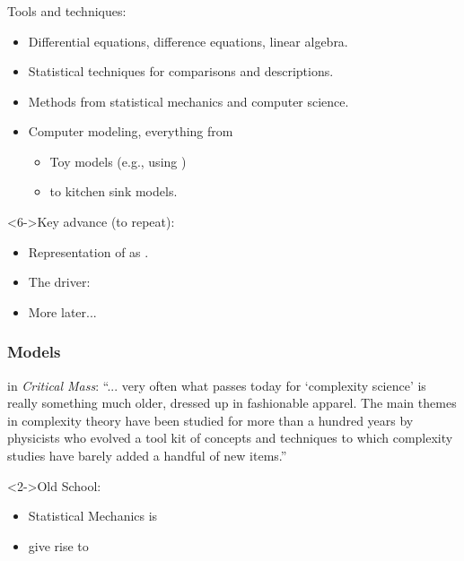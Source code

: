 \begin{frame}
  \frametitle{}

  \begin{block}{Tools and techniques:}
    \begin{itemize}
    \item<2-> 
      Differential equations, difference equations, linear algebra.
    \item<3-> 
      Statistical techniques for comparisons and descriptions.
    \item<4-> 
      Methods from statistical mechanics and computer science.
    \item<5-> 
      Computer modeling, everything from
      \begin{itemize}
      \item 
        Toy models (e.g., using )
      \item 
        to kitchen sink models.
      \end{itemize}
    \end{itemize}
  \end{block}

  \begin{block}<6->{Key advance (to repeat):}
    \begin{itemize}
    \item<6-> Representation of  as .
    \item<7-> The driver: 
    \item<8-> More later...
    \end{itemize}
  \end{block}

\end{frame}

\begin{frame}
  \frametitle{Models}

  \begin{block}{ in \textit{Critical Mass}:}\cite{ball2004a}
    ``... very often what passes today for `complexity science'
    is really something much older, dressed up in fashionable apparel.
    The main themes in complexity theory have been studied
    for more than a hundred years by physicists who evolved
    a tool kit of concepts and techniques to which complexity
    studies have barely added a handful of new items.''
  \end{block}

  \begin{block}<2->{Old School:}
  \begin{itemize}
  \item<2-> 
    Statistical Mechanics is 
  \item<3->
     give rise to 
  \end{itemize}
  \end{block}

\end{frame}

